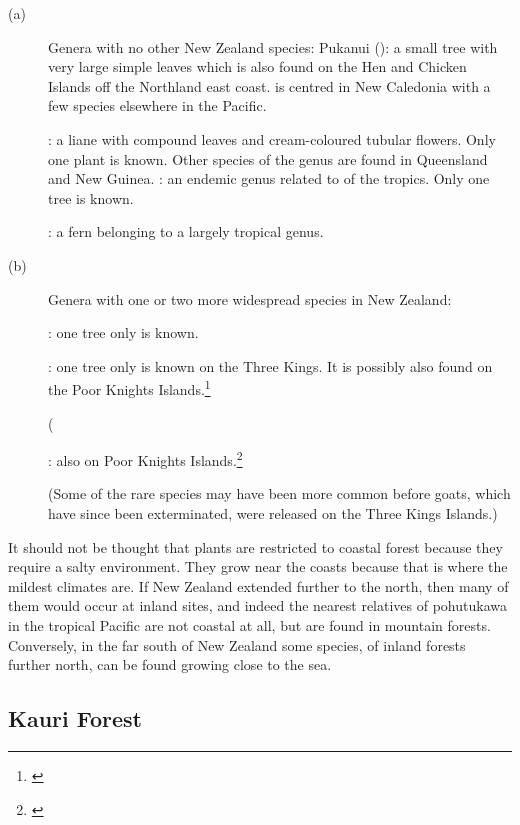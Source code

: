 \begin{description}
\item[{(a)}]Genera with no other New Zealand species: Pukanui (): a small tree with very large simple leaves which is also found on the Hen and Chicken Islands off the Northland east coast.  is centred in New Caledonia with a few species elsewhere in the Pacific.

: a liane with compound leaves and cream-coloured tubular flowers.
Only one plant is known.
Other species of the genus are found in Queensland and New Guinea. : an endemic genus related to  of the tropics.
Only one tree is known.

: a fern belonging to a largely tropical genus.
\item[{(b)}]Genera with one or two more widespread species in New Zealand:

: one tree only is known.

: one tree only is known on the Three Kings.
It is possibly also found on the Poor Knights Islands.\footnote{\cite{wright1983conservation}}

 (

: also on Poor Knights Islands.\footnote{\cite{wright1983conservation}}

(Some of the rare species may have been more common before goats, which have since been exterminated, were released on the Three Kings Islands.)
\end{description}

It should not be thought that plants are restricted to coastal forest because they require a salty environment.
They grow near the coasts because that is where the mildest climates are.
If New Zealand extended further to the north, then many of them would occur at inland sites, and indeed the nearest relatives of pohutukawa in the tropical Pacific are not coastal at all, but are found in mountain forests.
Conversely, in the far south of New Zealand some species, of inland forests further north, can be found growing close to the sea.

\subsection{Kauri Forest}

